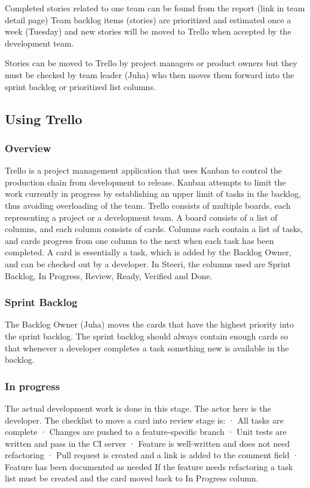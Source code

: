 \documentclass[english]{tktltiki2}
\theoremstyle{definition}
\theoremstyle{remark}
\begin{document}
Completed stories related to one team can be found from the report (link in team detail page)
Team backlog items (stories) are prioritized and estimated once a week (Tuesday) and new stories will be moved to Trello when accepted by the development team.

Stories can be moved to Trello by project managers or product owners but they must be checked by team leader (Juha) who then moves them forward into the sprint backlog or prioritized list columns.

\subsection{Using Trello}

\subsubsection{Overview}
Trello is a project management application that uses Kanban to control the production chain from development to release. Kanban attempts to limit the work currently in progress by establishing an upper limit of tasks in the backlog, thus avoiding overloading of the team. Trello consists of multiple boards, each representing a project or a development team. A board consists of a list of columns, and each column consists of cards. Columns each contain a list of tasks, and cards progress from one column to the next when each task has been completed. A card is essentially a task, which is added by the Backlog Owner, and can be checked out by a developer. In Steeri, the columns used are Sprint Backlog, In Progress, Review, Ready, Verified and Done. 

\subsubsection{Sprint Backlog}
The Backlog Owner (Juha) moves the cards that have the highest priority into the sprint backlog. The sprint backlog should always contain enough cards so that whenever a developer completes a task something new is available in the backlog.

\subsubsection{In progress}
The actual development work is done in this stage. The actor here is the developer. The checklist to move a card into review stage is:
·       All tasks are complete
·       Changes are pushed to a feature-specific branch
·       Unit tests are written and pass in the CI server
·       Feature is well-written and does not need refactoring
·       Pull request is created and a link is added to the comment field
·       Feature has been documented as needed
If the feature needs refactoring a task list must be created and the card moved back to In Progress column.
\end{document}
